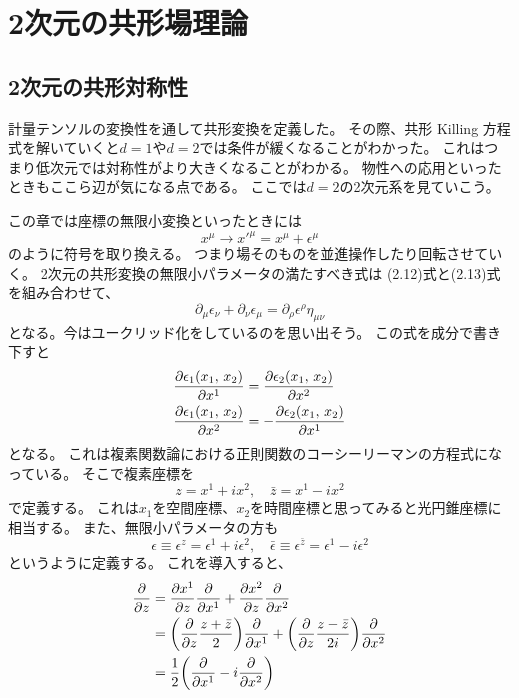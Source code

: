 \documentclass[../../master.tex]{subfiles}
\begin{document}
\chapter{2次元の共形場理論}
\section{2次元の共形対称性}
計量テンソルの変換性を通して共形変換を定義した。
その際、共形 Killing 方程式を解いていくと\(d=1\)や\(d=2\)では条件が緩くなることがわかった。
これはつまり低次元では対称性がより大きくなることがわかる。
物性への応用といったときもここら辺が気になる点である。
ここでは\(d=2\)の2次元系を見ていこう。

この章では座標の無限小変換といったときには
\begin{equation*}
    x^\mu \rightarrow x'^\mu = x^\mu + \epsilon^\mu
\end{equation*}
のように符号を取り換える。
つまり場そのものを並進操作したり回転させていく。
2次元の共形変換の無限小パラメータの満たすべき式は
(2.12)式と(2.13)式を組み合わせて、
\begin{equation}
    \partial_\mu \epsilon_\nu + \partial_\nu \epsilon_\mu = \partial_\rho \epsilon^\rho \eta_{\mu\nu}
\end{equation}
となる。今はユークリッド化をしているのを思い出そう。
この式を成分で書き下すと
\begin{align}
    \pdv{\epsilon_1(x_1,\,x_2)}{x^1} &= \pdv{\epsilon_2(x_1,\,x_2)}{x^2} \\
    \pdv{\epsilon_1(x_1,\,x_2)}{x^2} &= -\pdv{\epsilon_2(x_1,\,x_2)}{x^1}
\end{align}
となる。
これは複素関数論における正則関数のコーシーリーマンの方程式になっている。
そこで複素座標を
\begin{equation}
    z = x^1 + ix^2,\quad \bar{z} = x^1 -ix^2
\end{equation}
で定義する。
これは\(x_1\)を空間座標、\(x_2\)を時間座標と思ってみると光円錐座標に相当する。
また、無限小パラメータの方も
\begin{equation}
    \epsilon \equiv \epsilon^z = \epsilon^1 + i\epsilon^2,\quad \bar{\epsilon} \equiv \epsilon^{\bar{z}} = \epsilon^1 - i\epsilon^2
\end{equation}
というように定義する。
これを導入すると、
\begin{align*}
    \pdv{z}
        &= \pdv{x^1}{z}\pdv{x^1} + \pdv{x^2}{z}\pdv{x^2} \\
        &= \qty(\pdv{z} \frac{z+\bar{z}}{2})\pdv{x^1} + \qty(\pdv{z} \frac{z-\bar{z}}{2i})\pdv{x^2}\\
        &= \frac{1}{2}\qty(\pdv{x^1}-i\pdv{x^2})
\end{align*}
\end{document}
